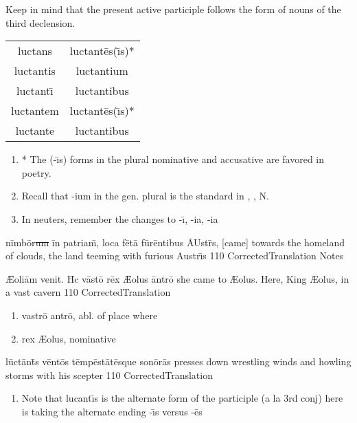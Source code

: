 {	Keep in mind that the present active participle follows the form of nouns of the third declension.  
	\vskip 2mm
	\begin{tabular}{|c|c|}
		\hline
		luctans       & luctant\={e}s(\={\i}s)*\\ 
		luctantis     & luctantium\\
		luctant\={\i} & luctantibus\\
		luctantem     & luctant\={e}s(\={\i}s)*\\
		luctante      & luctantibus\\
		\hline
	\end{tabular}

	\vskip 2mm	
	
	\begin{enumerate}
		\item * The (-\={\i}s) forms in the plural nominative and accusative are favored in poetry.
		\item Recall that -ium in the gen. plural is the standard in \male, \female, N.
		\item  In neuters, remember the changes to -\={\i}, -ia, -ia
	\end{enumerate}
	 
}



\latline
  {n\=imb\={\macron o}r\sout{um }\=in p\-atr\-ia\=m, l\-oc\-a f\={\macron e}t\=a f\=ur\=ent\-ib\-us \={AU}str\={\macron {\i}}s,}
  { [came] towards the homeland of clouds, the land teeming with furious Austr\={\i}s }
  {110}
  { CorrectedTranslation }
  { Notes }



\latline
  {\={\AE}\-ol\-i\=am v\-en\-it.  H\={\macron {\i}}c v\=ast\={\macron o} r\={\macron e}x \={\AE}\-ol\-us \=antr\={\macron o}}
  { she came to {\AE}olus.  Here, King {\AE}olus, in a vast cavern }
  {110}
  { CorrectedTranslation }
  { \begin{enumerate}
  	\item vastr\={o} antr\={o}, abl. of place where
  	\item rex {\AE}olus, nominative
  \end{enumerate} }



\latline
  {l\=uct\=ant\={\macron {\i}}s v\=ent\={\macron o}s t\=emp\=est\={\macron a}t\={\macron e}squ\-e s\-on\={\macron o}r\={\macron a}s
}
  { presses down wrestling winds and howling storms with his scepter}
  {110}
  { CorrectedTranslation }
  { \begin{enumerate}
  	\item Note that lucant\={\i}s is the alternate form of the participle (a la 3rd conj) here is taking the alternate ending -\={\i}s versus -\={e}s
  \end{enumerate} }


